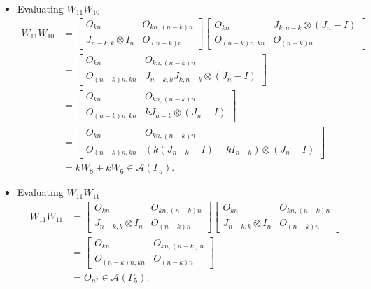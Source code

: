 \begin{itemize}
\item Evaluating $W_{11}W_{10}$
\begin{align*}
    W_{11}W_{10}
    &= \begin{bmatrix}
        O_{kn} & O_{kn, (n-k)n} \\
        J_{n-k, k}\otimes I_n & O_{(n-k)n}
    \end{bmatrix}
    \begin{bmatrix}
        O_{kn} & J_{k,n-k} \otimes (J_n-I) \\
        O_{(n-k)n,kn} & O_{(n-k)n}
    \end{bmatrix}\\
    &= \begin{bmatrix}
        O_{kn} & O_{kn, (n-k)n} \\
        O_{(n-k)n,kn} & J_{n-k, k}J_{k,n-k} \otimes (J_n-I)
    \end{bmatrix}\\
    &= \begin{bmatrix}
        O_{kn} & O_{kn, (n-k)n} \\
        O_{(n-k)n,kn} & kJ_{n-k} \otimes (J_n-I)
    \end{bmatrix}\\
    &= \begin{bmatrix}
        O_{kn} & O_{kn, (n-k)n} \\
        O_{(n-k)n,kn} & (k(J_{n-k}-I)+kI_{n-k}) \otimes (J_n-I)
    \end{bmatrix}\\
    &= kW_8 + kW_6\in\mathcal{A}(\Gamma_5).
\end{align*}

\item Evaluating $W_{11}W_{11}$
\begin{align*}
    W_{11}W_{11}
    &= \begin{bmatrix}
        O_{kn} & O_{kn, (n-k)n} \\
        J_{n-k, k}\otimes I_n & O_{(n-k)n}
    \end{bmatrix}
    \begin{bmatrix}
        O_{kn} & O_{kn, (n-k)n} \\
        J_{n-k, k}\otimes I_n & O_{(n-k)n}
    \end{bmatrix}\\
    &= \begin{bmatrix}
        O_{kn} & O_{kn, (n-k)n} \\
        O_{(n-k)n,kn} & O_{(n - k)n}
    \end{bmatrix}\\
    &= O_{n^2} \in\mathcal{A}(\Gamma_5).
\end{align*}


\end{itemize}
